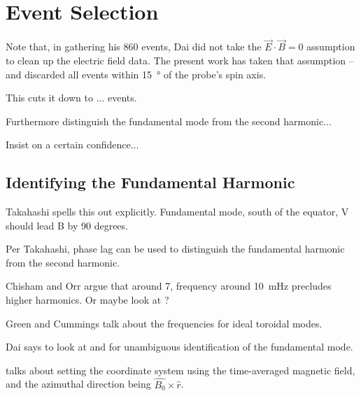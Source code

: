 
\section{Event Selection}




Note that, in gathering his 860 events, Dai\cite{dai_2015} did not take the $\vec{E} \cdot \vec{B} = 0$ assumption to clean up the electric field data. The present work has taken that assumption -- and discarded all events within \SI{15}{\degree} of the probe's spin axis. 

This cuts it down to ... events. 

Furthermore distinguish the fundamental mode from the second harmonic...

Insist on a certain confidence... 



\subsection{Identifying the Fundamental Harmonic}

Takahashi\cite{takahashi_2013} spells this out explicitly. Fundamental mode, south of the equator, V should lead B by 90 degrees. 

Per Takahashi\cite{takahashi_2011}, phase lag can be used to distinguish the fundamental harmonic from the second harmonic. 

Chisham and Orr\cite{chisham_1991} argue that around \SI{7}{\RE}, frequency around \SI{10}{\mHz} precludes higher harmonics. Or maybe look at \cite{green_1985}?

Green\cite{green_1979} and Cummings\cite{cummings_1969} talk about the frequencies for ideal toroidal modes. 

Dai\cite{dai_2015} says to look at \cite{takahashi_2011} and \cite{dai_2013} for unambiguous identification of the fundamental mode. 

\cite{liu_2010} talks about setting the coordinate system using the time-averaged magnetic field, and the azimuthal direction being $\hat{B_0} \times \hat{r}$. 





